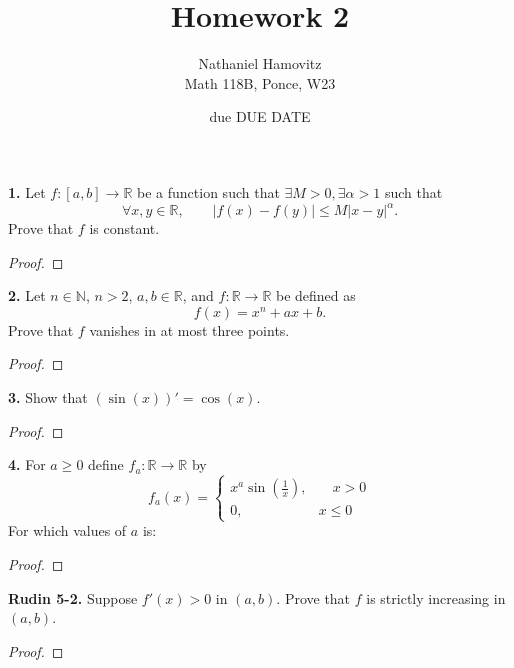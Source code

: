 \documentclass{article}
\newcommand{\R}{\mathbb{R}}
\newcommand{\N}{\mathbb{N}}
\newcommand{\abs}[1]{\left| #1 \right|}
\newcommand{\paren}[1]{\left( #1 \right)}
\newcommand{\problem}[1]{\noindent \textbf{#1}}
\begin{document}


\title{Homework 2} %
\author{Nathaniel Hamovitz\\Math 118B, Ponce, W23}
\date{due DUE DATE}

\maketitle

\problem{1. }
Let $f: [a, b] \to \R$ be a function such that $\exists M > 0, \exists \alpha > 1$ such that
$$\forall x, y \in \R, \qquad \abs{f(x) - f(y)} \le M\abs{x - y}^{\alpha}.$$
Prove that $f$ is constant.

\begin{proof}
    
\end{proof}


\problem{2. }
Let $n \in \N$, $n > 2$, $a, b \in \R$, and $f: \R \to \R$ be defined as
$$f(x) = x^n + ax + b.$$
Prove that $f$ vanishes in at most three points.

\begin{proof}
    
\end{proof}


\problem{3. }
Show that $(\sin(x))' = \cos(x)$.
\begin{proof}
    
\end{proof}


\problem{4. }
For $a \ge 0$ define $f_a : \R \to \R$ by
$$f_a(x) = \begin{cases}
    x^a \sin\paren{\frac{1}{x}}, & \quad x > 0 \\
    0, & x \le 0
\end{cases}$$
For which values of $a$ is:

\begin{proof}
    
\end{proof}


\problem{Rudin 5-2. }
Suppose $f'(x) > 0$ in $(a, b)$. Prove that $f$ is strictly increasing in $(a, b)$.
\begin{proof}
    
\end{proof}
\end{document}
